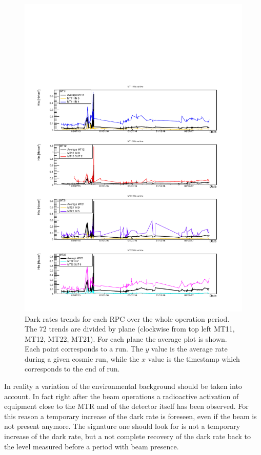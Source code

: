 \begin{figure}[!t]
\begin{center}
\includegraphics[width=0.95\linewidth]{Chapters/Performance/Figs/DarkRate.pdf}
\caption{Dark rates trends for each RPC over the whole operation period. The 72 trends are divided by plane (clockwise from top left MT11, MT12, MT22, MT21). For each plane the average plot is shown. Each point corresponds to a run. The $y$ value is the average rate during a given cosmic run, while the $x$ value is the timestamp which corresponds to the end of run.}
\label{fig:DarkRate4Planes}
\end{center}
\end{figure}

In reality a variation of the environmental background should be taken into account.
In fact right after the beam operations a radioactive activation of equipment close to the MTR and of the detector itself has been observed.
For this reason a temporary increase of the dark rate is foreseen, even if the beam is not present anymore.
The signature one should look for is not a temporary increase of the dark rate, but a not complete recovery of the dark rate back to the level measured before a period with beam presence.

